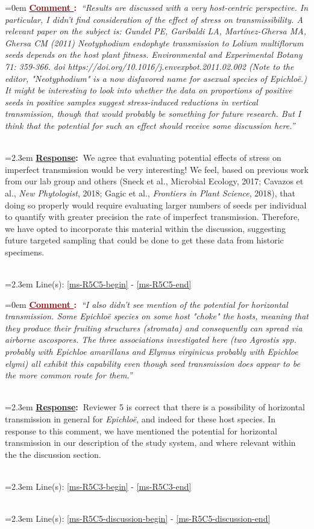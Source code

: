 \documentclass[12pt]{article}
\newcounter{cN}
\newcommand{\comment}[1]{
	\vspace{2em}
	\refstepcounter{cN} %
	\noindent \hangindent=0em \textbf{\textcolor{Maroon}{\uline{Comment \thecN}:~}}\emph{``#1''}
	}
\newcommand{\response}[1]{
	\\[0.25em]
	\hangindent=2.3em \textbf{\textcolor{NavyBlue}{\uline{Response}:~}}#1
	}
\newcommand{\linesref}[2]{
		\\[0.25em]
	\hangindent=2.3em {\color{Mahogany} Line(s): \ref{#1} - \ref{#2}}
}
\begin{document}
\comment{Results are discussed with a very host-centric perspective. In particular, I didn't find consideration of the effect of stress on transmissibility. A relevant paper on the subject is: Gundel PE, Garibaldi LA, Martínez-Ghersa MA, Ghersa CM (2011) Neotyphodium endophyte transmission to Lolium multiflorum seeds depends on the host plant fitness. Environmental and Experimental Botany 71: 359-366. doi https://doi.org/10.1016/j.envexpbot.2011.02.002 (Note to the editor, "Neotyphodium" is a now disfavored name for asexual species of Epichloë.) It might be interesting to look into whether the data on proportions of positive seeds in positive samples suggest stress-induced reductions in vertical transmission, though that would probably be something for future research. But I think that the potential for such an effect should receive some discussion here.}
\response{We agree that evaluating potential effects of stress on imperfect transmission would be very interesting! We feel, based on previous work from our lab group and others (Sneck et al., {Microbial Ecology}, 2017; Cavazos et al., \emph{New Phytologist}, 2018; Gagic et al., \emph{Frontiers in Plant Science}, 2018), that doing so properly would require evaluating larger numbers of seeds per individual to quantify with greater precision the rate of imperfect transmission. Therefore, we have opted to incorporate this material within the discussion, suggesting future targeted sampling that could be done to get these data from historic specimens.}
\linesref{ms-R5C5-begin}{ms-R5C5-end}


\comment{I also didn't see mention of the potential for horizontal transmission. Some \emph{Epichloë} species on some host "choke" the hosts, meaning that they produce their fruiting structures (stromata) and consequently can spread via airborne ascospores. The three associations investigated here (two \emph{Agrostis} spp. probably with \emph{Epichloe amarillans} and \emph{Elymus virginicus} probably with \emph{Epichloe elymi}) all exhibit this capability even though seed transmission does appear to be the more common route for them.}
\response{Reviewer 5 is correct that there is a possibility of horizontal transmission in general for \emph{Epichloë}, and indeed for these host species. In response to this comment, we have mentioned the potential for horizontal transmission in our description of the study system, and where relevant within the the discussion section.}
\linesref{ms-R5C3-begin}{ms-R5C3-end}
\linesref{ms-R5C5-discussion-begin}{ms-R5C5-discussion-end} 
\end{document}
